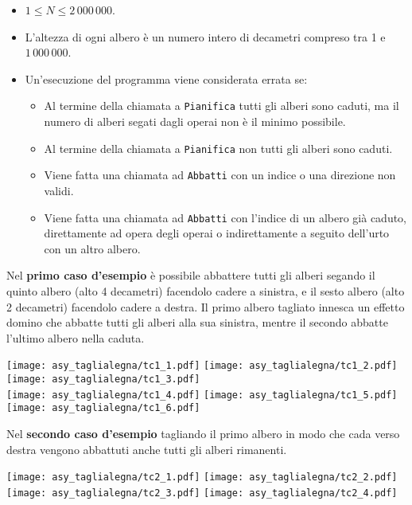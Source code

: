 \Constraints 
\begin{itemize}[nolistsep,itemsep=2mm]
  \item $1 \le {N} \le 2\,000\,000$.
  \item L'altezza di ogni albero è un numero intero di decametri compreso tra 1 e $1\,000\,000$.
  \item Un'esecuzione del programma viene considerata errata se:\begin{itemize}
  	\item Al termine della chiamata a \texttt{Pianifica} tutti gli alberi sono caduti, ma il numero di alberi segati dagli operai non è il minimo possibile.
  	\item Al termine della chiamata a \texttt{Pianifica} non tutti gli alberi sono caduti.
  	\item Viene fatta una chiamata ad \texttt{Abbatti} con un indice o una direzione non validi.
  	\item Viene fatta una chiamata ad \texttt{Abbatti} con l'indice di un albero già caduto, direttamente ad opera degli operai o indirettamente a seguito dell'urto con un altro albero.
  \end{itemize}
\end{itemize}


\Examples
\begin{example}
%
%
\end{example}


\Explanation
Nel \textbf{primo caso d'esempio} è possibile abbattere tutti gli alberi segando il quinto albero (alto 4 decametri) facendolo cadere a sinistra, e il sesto albero (alto 2 decametri) facendolo cadere a destra. Il primo albero tagliato innesca un effetto domino che abbatte tutti gli alberi alla sua sinistra, mentre il secondo abbatte l'ultimo albero nella caduta.
\begin{center}
	\def\sf{.83}
	\texttt{[image: asy\_taglialegna/tc1\_1.pdf]}\hfill
	\texttt{[image: asy\_taglialegna/tc1\_2.pdf]}\hfill
	\texttt{[image: asy\_taglialegna/tc1\_3.pdf]}\\[4mm]
	\texttt{[image: asy\_taglialegna/tc1\_4.pdf]}\hfill
	\texttt{[image: asy\_taglialegna/tc1\_5.pdf]}\hfill
	\texttt{[image: asy\_taglialegna/tc1\_6.pdf]}\\
\end{center}
\vspace{1cm}
Nel \textbf{secondo caso d'esempio} tagliando il primo albero in modo che cada verso destra vengono abbattuti anche tutti gli alberi rimanenti.
\begin{center}
	\def\sf{.83}
	\texttt{[image: asy\_taglialegna/tc2\_1.pdf]}\hfill
	\texttt{[image: asy\_taglialegna/tc2\_2.pdf]}\hfill
	\texttt{[image: asy\_taglialegna/tc2\_3.pdf]}\hfill
	\texttt{[image: asy\_taglialegna/tc2\_4.pdf]}
\end{center}

